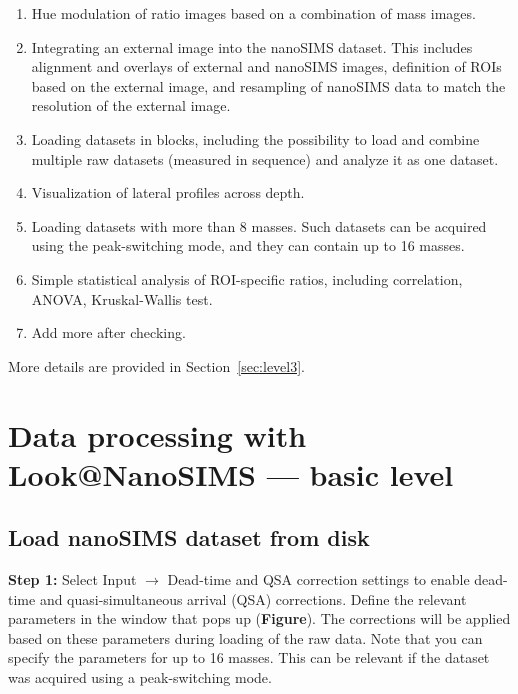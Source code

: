 \documentclass[a4paper, 11pt]{article}
\newcommand{\lans}[1]{{\color{magenta}#1}}
\newcommand\ra{\rightarrow}
\newcommand\figref[0]{\textbf{Figure}}
\newcommand\s[1]{\noindent\textbf{Step #1:}}
\begin{document}
\begin{enumerate}

\item Hue modulation of ratio images based on a combination of mass images.

\item Integrating an external image into the nanoSIMS dataset. This includes alignment and overlays of external and nanoSIMS images, definition of ROIs based on the external image, and resampling of nanoSIMS data to match the resolution of the external image.

\item Loading datasets in blocks, including the possibility to load and combine multiple raw datasets (measured in sequence) and analyze it as one dataset.

\item Visualization of lateral profiles across depth.

\item Loading datasets with more than 8 masses. Such datasets can be acquired using the peak-switching mode, and they can contain up to 16 masses.

\item Simple statistical analysis of ROI-specific ratios, including correlation, ANOVA, Kruskal-Wallis test.

\item Add more after checking.

\end{enumerate}
%
More details are provided in Section~\ref{sec:level3}.


\section{Data processing with Look@NanoSIMS --- basic level}
\label{sec:level1}

\addtolength{\parskip}{2mm}

\subsection{Load nanoSIMS dataset from disk}

\s1 Select \lans{Input} $\ra$ \lans{Dead-time and QSA correction settings} to enable dead-time and quasi-simul\-ta\-neous arrival (QSA) corrections. Define the relevant parameters in the window that pops up (\figref). The corrections will be applied based on these parameters during loading of the raw data. Note that you can specify the parameters for up to 16 masses. This can be relevant if the dataset was acquired using a peak-switching mode.
\end{document}
